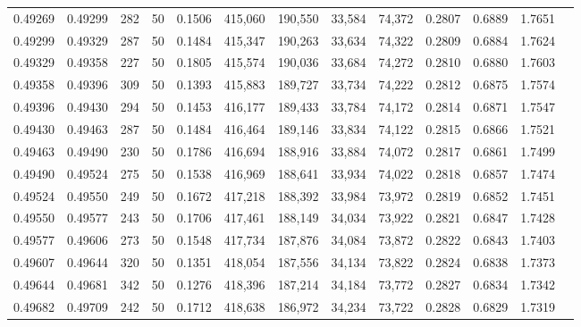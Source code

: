 \begin{tabular}{rrrrrrrrrrrrr}
0.49269 & 0.49299 &   282 &  50 &                                     0.1506 & 415,060 & 190,550 &  33,584 &  74,372 & 0.2807 & 0.6889 & 1.7651 \\
0.49299 & 0.49329 &   287 &  50 &                                     0.1484 & 415,347 & 190,263 &  33,634 &  74,322 & 0.2809 & 0.6884 & 1.7624 \\
0.49329 & 0.49358 &   227 &  50 &                                     0.1805 & 415,574 & 190,036 &  33,684 &  74,272 & 0.2810 & 0.6880 & 1.7603 \\
0.49358 & 0.49396 &   309 &  50 &                                     0.1393 & 415,883 & 189,727 &  33,734 &  74,222 & 0.2812 & 0.6875 & 1.7574 \\
0.49396 & 0.49430 &   294 &  50 &                                     0.1453 & 416,177 & 189,433 &  33,784 &  74,172 & 0.2814 & 0.6871 & 1.7547 \\
0.49430 & 0.49463 &   287 &  50 &                                     0.1484 & 416,464 & 189,146 &  33,834 &  74,122 & 0.2815 & 0.6866 & 1.7521 \\
0.49463 & 0.49490 &   230 &  50 &                                     0.1786 & 416,694 & 188,916 &  33,884 &  74,072 & 0.2817 & 0.6861 & 1.7499 \\
0.49490 & 0.49524 &   275 &  50 &                                     0.1538 & 416,969 & 188,641 &  33,934 &  74,022 & 0.2818 & 0.6857 & 1.7474 \\
0.49524 & 0.49550 &   249 &  50 &                                     0.1672 & 417,218 & 188,392 &  33,984 &  73,972 & 0.2819 & 0.6852 & 1.7451 \\
0.49550 & 0.49577 &   243 &  50 &                                     0.1706 & 417,461 & 188,149 &  34,034 &  73,922 & 0.2821 & 0.6847 & 1.7428 \\
0.49577 & 0.49606 &   273 &  50 &                                     0.1548 & 417,734 & 187,876 &  34,084 &  73,872 & 0.2822 & 0.6843 & 1.7403 \\
0.49607 & 0.49644 &   320 &  50 &                                     0.1351 & 418,054 & 187,556 &  34,134 &  73,822 & 0.2824 & 0.6838 & 1.7373 \\
0.49644 & 0.49681 &   342 &  50 &                                     0.1276 & 418,396 & 187,214 &  34,184 &  73,772 & 0.2827 & 0.6834 & 1.7342 \\
0.49682 & 0.49709 &   242 &  50 &                                     0.1712 & 418,638 & 186,972 &  34,234 &  73,722 & 0.2828 & 0.6829 & 1.7319 \\

\end{tabular}
